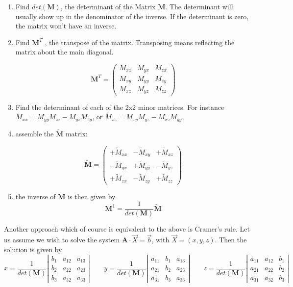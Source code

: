 \begin{enumerate}
\item
Find $det({\bm M})$, the determinant of the Matrix ${\bm M}$.
The determinant will usually show up in the denominator of the inverse. If the determinant is zero, the matrix won't have an inverse.

\item  Find ${\bm M}^T$ , the transpose of the matrix. Transposing means reflecting the matrix about the main diagonal.

\[
{\bm M}^T=
\left(
\begin{array}{ccc}
M_{xx} & M_{yx} & M_{zx} \\
M_{xy} & M_{yy} & M_{zy} \\
M_{xz} & M_{yz} & M_{zz} 
\end{array}
\right)
\]

\item  Find the determinant of each of the 2x2 minor matrices. For instance $\tilde{M}_{xx}=M_{yy}M_{zz}-M_{yz}M_{zy}$,
or $\tilde{M}_{xz}=M_{xy}M_{yz}- M_{xz}M_{yy}$.

\item assemble the $\tilde{\bm M}$ matrix:

\[
\tilde{\bm M}=
\left(
\begin{array}{ccc}
+\tilde{M}_{xx} & -\tilde{M}_{xy} & +\tilde{M}_{xz} \\
-\tilde{M}_{yx} & +\tilde{M}_{yy} & -\tilde{M}_{yz} \\
+\tilde{M}_{zx} & -\tilde{M}_{zy} & +\tilde{M}_{zz} 
\end{array}
\right)
\]

\item the inverse of ${\bm M}$ is then given by
\[
{\bm M}^{1} = \frac{1}{det({\bm M})} \tilde{\bm M}
\]

\end{enumerate}

Another approach which of course is equivalent to the above is Cramer's rule. Let us assume we wish to solve the 
system $\bm A \cdot \vec X = \vec b$, with $\vec X=(x,y,z)$. Then the solution is given by
\[
x=
\frac{1}{det(\bm M)}
\left| 
\begin{array}{ccc}
b_1 & a_{12} & a_{13} \\
b_2 & a_{22} & a_{23} \\
b_3 & a_{32} & a_{33}
\end{array}
\right|
\qquad
y=
\frac{1}{det(\bm M)}
\left| 
\begin{array}{ccc}
a_{11} & b_1 & a_{13} \\
a_{21} & b_2 & a_{23} \\
a_{31} & b_3 & a_{33} 
\end{array}
\right|
\qquad
z=
\frac{1}{det(\bm M)}
\left| 
\begin{array}{ccc}
a_{11} & a_{12} & b_1\\
a_{21} & a_{22} & b_2\\
a_{31} & a_{32} & b_3
\end{array}
\right|
\]



